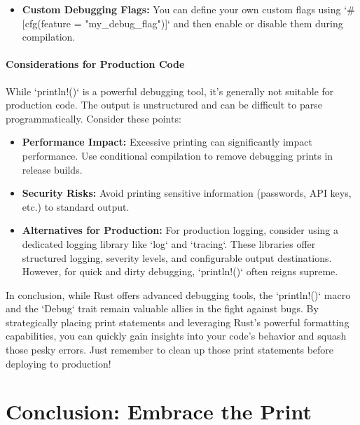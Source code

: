 \documentclass{article}
\begin{document}
{{{{\begin{itemize}
    \item \textbf{Custom Debugging Flags:} You can define your own custom flags using `#[cfg(feature = "my_debug_flag")]` and then enable or disable them during compilation.
\end{itemize}

\subsection*{Considerations for Production Code}

While `println!()` is a powerful debugging tool, it's generally not suitable for production code. The output is unstructured and can be difficult to parse programmatically.  Consider these points:

\begin{itemize}
    \item \textbf{Performance Impact:}  Excessive printing can significantly impact performance.  Use conditional compilation to remove debugging prints in release builds.
    \item \textbf{Security Risks:}  Avoid printing sensitive information (passwords, API keys, etc.) to standard output.
    \item \textbf{Alternatives for Production:}  For production logging, consider using a dedicated logging library like `log` and `tracing`. These libraries offer structured logging, severity levels, and configurable output destinations. However, for quick and dirty debugging, `println!()` often reigns supreme.
\end{itemize}

In conclusion, while Rust offers advanced debugging tools, the `println!()` macro and the `Debug` trait remain valuable allies in the fight against bugs. By strategically placing print statements and leveraging Rust's powerful formatting capabilities, you can quickly gain insights into your code's behavior and squash those pesky errors. Just remember to clean up those print statements before deploying to production!


\part*{Conclusion: Embrace the Print} %
\label{part-10-Conclusion__Embrace_the_Print}

}}}}
\end{document}
